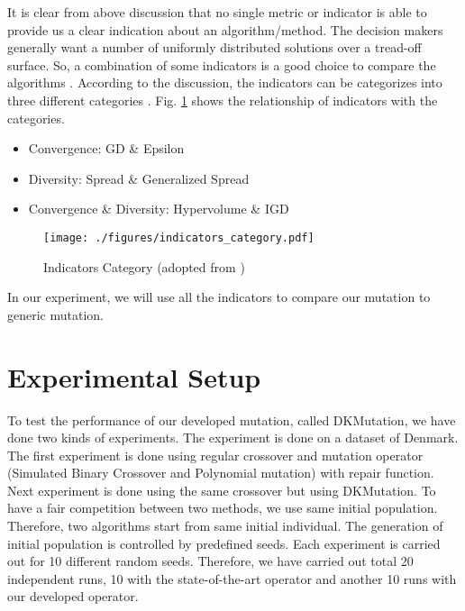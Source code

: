 \documentclass{article}
\begin{document}
It is clear from above discussion that no single metric or indicator is able to provide us a clear indication about an algorithm/method. 
The decision makers generally want a number of uniformly distributed solutions over a tread-off surface. 
So, a combination of some indicators is a good choice to compare the algorithms \cite{sarker_assessment_2002}.
According to the discussion, the indicators can be categorizes into three different categories \cite{arribere_tecnicas_2010, siwei_jiang_consistencies_2014}. Fig. \ref{fig:Indicator categories} shows the relationship of indicators with the categories.  
\begin{itemize}
\item Convergence: GD \& Epsilon
\item Diversity: Spread \& Generalized Spread
\item Convergence \& Diversity: Hypervolume \& IGD
\end{itemize}



\begin{figure}
\centering

\texttt{[image: ./figures/indicators\_category.pdf]}
\caption{Indicators Category (adopted from \cite{arribere_tecnicas_2010})}
\label{fig:Indicator categories}
\end{figure} 

In our experiment, we will use all the indicators to compare our mutation to generic mutation.


\section{Experimental Setup}
To test the performance of our developed mutation, called DKMutation, we have done two kinds of experiments. 
The experiment is done on a dataset of Denmark.  
The first experiment is done using regular crossover and mutation operator (Simulated Binary Crossover and Polynomial mutation) with repair function.
Next experiment is done using the same crossover but using DKMutation. 
To have a fair competition between two methods, we use same initial population.
Therefore, two algorithms start from same initial individual.
The generation of initial population is controlled by predefined seeds.
Each experiment is carried out for 10 different random seeds. 
Therefore, we have carried out total 20 independent runs, 10 with the state-of-the-art operator and another 10 runs with our developed operator.
\end{document}
